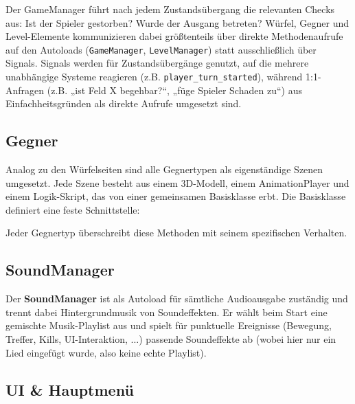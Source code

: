 \documentclass[oneside]{ausarbeitung}
\begin{document}
Der GameManager führt nach jedem Zustandsübergang die relevanten Checks aus: Ist der Spieler gestorben? Wurde der Ausgang betreten? Würfel, Gegner und Level-Elemente kommunizieren dabei größtenteils über direkte Methodenaufrufe auf den Autoloads (\texttt{GameManager}, \texttt{LevelManager}) statt ausschließlich über Signals. Signals werden für Zustands\"ubergänge genutzt, auf die mehrere unabhängige Systeme reagieren (z.B. \texttt{player\_turn\_started}), während 1:1-Anfragen (z.B. „ist Feld X begehbar?“, „füge Spieler Schaden zu“) aus Einfachheitsgründen als direkte Aufrufe umgesetzt sind.

\subsection{Gegner}
 
Analog zu den Würfelseiten sind alle Gegnertypen als eigenständige Szenen umgesetzt. Jede Szene besteht aus einem 3D-Modell, einem AnimationPlayer und einem Logik-Skript, das von einer gemeinsamen Basisklasse erbt. Die Basisklasse definiert eine feste Schnittstelle:
 
\begin{infoblock}[0.3]
\end{infoblock}
 
Jeder Gegnertyp überschreibt diese Methoden mit seinem spezifischen Verhalten.

\subsection{SoundManager}

Der \textbf{SoundManager} ist als Autoload für sämtliche Audioausgabe zuständig und trennt dabei
Hintergrundmusik von Soundeffekten. Er wählt beim Start eine gemischte Musik-Playlist aus und spielt
für punktuelle Ereignisse (Bewegung, Treffer, Kills, UI-Interaktion, ...) passende Soundeffekte ab (wobei hier nur ein Lied eingefügt wurde, also keine echte Playlist).

\subsection{UI \& Hauptmenü}
\end{document}
